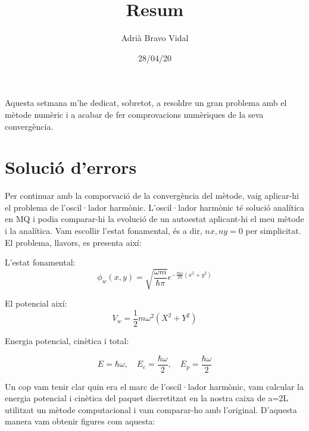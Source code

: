 \documentclass{article}
\begin{document}
	\title{Resum}
	\author{Adrià Bravo Vidal}
	\date{28/04/20}
	\maketitle	
	
Aquesta setmana m'he dedicat, sobretot, a resoldre un gran problema amb el mètode numèric i a acabar de fer comprovacions numèriques de la seva convergència.

\section{Solució d'errors}

Per continuar amb la comporvació de la convergència del mètode, vaig aplicar-hi el problema de l'oscil·lador harmònic. L'oscil·lador harmònic té solució analítica en MQ i podia comparar-hi la evolució de un autoestat aplicant-hi el meu mètode i la analítica. Vam escollir l'estat fonamental, és a dir,
\(nx,ny=0\) per simplicitat. El problema, llavors, es presenta així:

L'estat fonamental:
\begin{equation}
\phi_w(x,y)=\sqrt{\frac{\omega m}{\hbar\pi}}e^{-\frac{m\omega}{2\hbar}(x^2 +y^2)}
\end{equation}

El potencial així:
\begin{equation}
V_w=\frac{1}{2}m\omega^2(X^2+Y^2)
\end{equation}

Energia potencial, cinètica i total:

\begin{equation}
E=\hbar\omega, \quad E_c=\frac{\hbar\omega}{2}, \quad E_p=\frac{\hbar\omega}{2}
\end{equation}

Un cop vam tenir clar quin era el marc de l'oscil·lador harmònic, vam calcular la energia potencial i cinètica del paquet discretitzat en la nostra caixa de a=2L utilitzat un mètode computacional i vam comparar-ho amb l'original. D'aquesta manera vam obtenir figures com aquesta:
\end{document}
